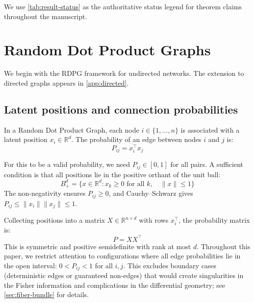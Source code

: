 \documentclass{article}
\newcommand{\RR}{\mathbb{R}}
\theoremstyle{plain}
\theoremstyle{definition}
\theoremstyle{remark}
\begin{document}
We use \cref{tab:result-status} as the authoritative status legend for theorem claims throughout the manuscript.


\section{Random Dot Product Graphs}\label{sec:rdpg}

We begin with the RDPG framework for undirected networks.
The extension to directed graphs appears in \cref{app:directed}.

\subsection{Latent positions and connection probabilities}

In a Random Dot Product Graph, each node $i \in \{1, \ldots, n\}$ is associated with a latent position $x_i \in \RR^d$.
The probability of an edge between nodes $i$ and $j$ is:
\begin{equation}
P_{ij} = x_i^\top x_j
\end{equation}

For this to be a valid probability, we need $P_{ij} \in [0, 1]$ for all pairs.
A sufficient condition is that all positions lie in the positive orthant of the unit ball:
\begin{equation}
B_+^d = \{x \in \RR^d : x_k \ge 0 \text{ for all } k, \quad \|x\| \le 1\}
\end{equation}
The non-negativity ensures $P_{ij} \ge 0$, and Cauchy--Schwarz gives $P_{ij} \le \|x_i\| \|x_j\| \le 1$.

Collecting positions into a matrix $X \in \RR^{n \times d}$ with rows $x_i^\top$, the probability matrix is:
\begin{equation}
P = XX^\top
\end{equation}
This is symmetric and positive semidefinite with rank at most $d$.
Throughout this paper, we restrict attention to configurations where all edge probabilities lie in the open interval: $0 < P_{ij} < 1$ for all $i, j$.
This excludes boundary cases (deterministic edges or guaranteed non-edges) that would create singularities in the Fisher information and complications in the differential geometry; see \cref{sec:fiber-bundle} for details.
\end{document}
